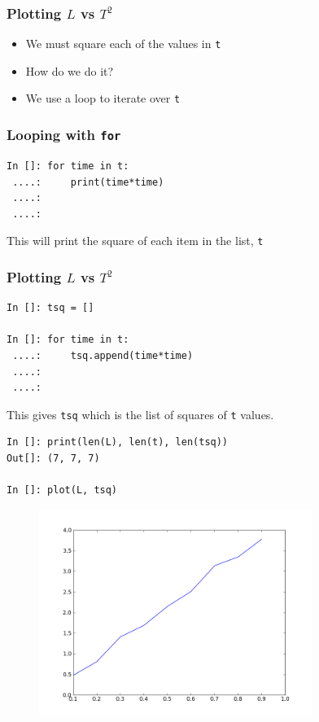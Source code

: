 \documentclass[14pt,compress]{beamer}
\newcounter{time}
\newcommand{\inctime}[1]{\addtocounter{time}{#1}{\tiny \thetime\ m}}
\newcommand{\typ}[1]{\lstinline{#1}}
\newcommand{\kwrd}[1]{ \texttt{\textbf{\color{blue}{#1}}}  }
\begin{document}
\begin{frame}[fragile]
\frametitle{Plotting $L$ vs $T^2$}
\begin{itemize}
\item We must square each of the values in \typ{t}
\item How do we do it?
\item We use a \kwrd{for} loop to iterate over \typ{t}
\end{itemize}
\end{frame}

\begin{frame}[fragile]
\frametitle{Looping with \texttt{for}}
\begin{lstlisting}
In []: for time in t:
 ....:     print(time*time)
 ....:
 ....:
\end{lstlisting}
This will print the square of each item in the list, \typ{t}
\end{frame}

\begin{frame}[fragile]
\frametitle{Plotting $L$ vs $T^2$}
\begin{lstlisting}
In []: tsq = []

In []: for time in t:
 ....:     tsq.append(time*time)
 ....:
 ....:

\end{lstlisting}
This gives \typ{tsq} which is the list of squares of \typ{t} values.
\begin{lstlisting}
In []: print(len(L), len(t), len(tsq))
Out[]: (7, 7, 7)

In []: plot(L, tsq)
\end{lstlisting}
\end{frame}

\begin{frame}[fragile]
\begin{figure}
\includegraphics[width=3.5in]{data/L-TSq-limited.png}
\end{figure}
\inctime{10}
\end{frame}
\end{document}
